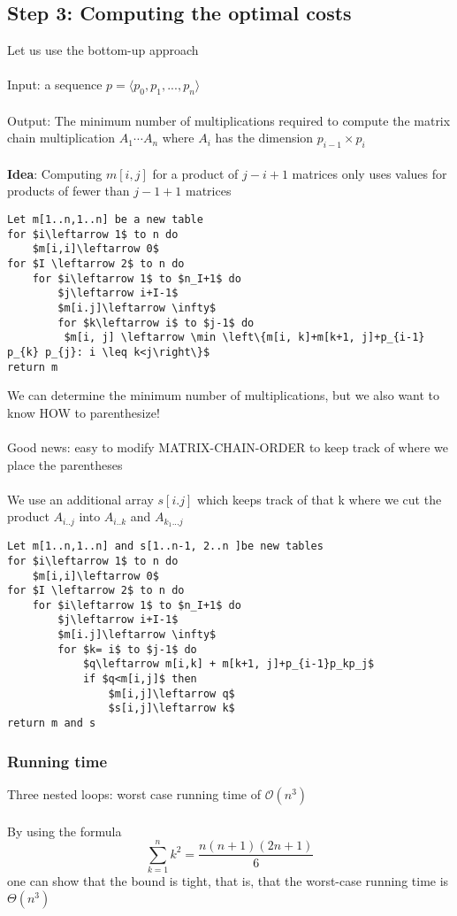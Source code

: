 \documentclass{article}[18pt]
\begin{document}
\subsection{Step 3: Computing the optimal costs}
Let us use the bottom-up approach\\
\\
Input: a sequence $p=\langle p_0,p_1,...,p_n\rangle$\\
\\
Output: The minimum number of multiplications required to compute the matrix chain multiplication $A_1\cdots A_n$ where $A_i$ has the dimension $p_{i-1}\times p_i$\\
\\
\textbf{Idea}: Computing $m[i,j]$ for a product of $j-i+1$ matrices only uses values for products of fewer than $j-1+1$ matrices
\begin{lstlisting}[caption=MATRIX-CHAIN-ORDER(p)]
Let m[1..n,1..n] be a new table
for $i\leftarrow 1$ to n do
	$m[i,i]\leftarrow 0$
for $I \leftarrow 2$ to n do
	for $i\leftarrow 1$ to $n_I+1$ do
		$j\leftarrow i+I-1$
		$m[i.j]\leftarrow \infty$
		for $k\leftarrow i$ to $j-1$ do
		 $m[i, j] \leftarrow \min \left\{m[i, k]+m[k+1, j]+p_{i-1} p_{k} p_{j}: i \leq k<j\right\}$
return m
\end{lstlisting}
We can determine the minimum number of multiplications, but we also want to know HOW to parenthesize!\\
\\
Good news: easy to modify MATRIX-CHAIN-ORDER to keep track of where we place the parentheses\\
\\
We use an additional array $s[i.j]$ which keeps track of that k where we cut the product $A_{i..j}$ into $A_{i..k}$ and $A_{k_1...j}$
\begin{lstlisting}[caption=MATRIX-CHAIN-ORDER'(p)]
Let m[1..n,1..n] and s[1..n-1, 2..n ]be new tables
for $i\leftarrow 1$ to n do
	$m[i,i]\leftarrow 0$
for $I \leftarrow 2$ to n do
	for $i\leftarrow 1$ to $n_I+1$ do
		$j\leftarrow i+I-1$
		$m[i.j]\leftarrow \infty$
		for $k= i$ to $j-1$ do
			$q\leftarrow m[i,k] + m[k+1, j]+p_{i-1}p_kp_j$
			if $q<m[i,j]$ then
				$m[i,j]\leftarrow q$
				$s[i,j]\leftarrow k$
return m and s
\end{lstlisting}
\subsubsection{Running time}
Three nested loops: worst case running time of $\mathcal{O}(n^3)$\\
\\
By using the formula
$$\sum_{k=1}^{n}k^2=\dfrac{n(n+1)(2n+1)}{6}$$
one can show that the bound is tight, that is, that the worst-case running time is $\Theta(n^3)$
\end{document}
